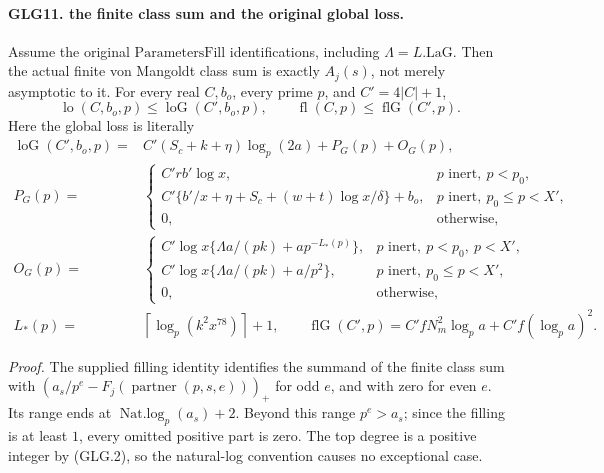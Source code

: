 \documentclass[11pt,a4paper]{article}
\numberwithin{equation}{section}
\theoremstyle{remark}\newtheorem{remark}[theorem]{Remark}
\begin{document}
\paragraph{GLG11. the finite class sum and the original global loss.}
\label{claim:GLG11}
Assume the original \(\mathrm{ParametersFill}\) identifications,
including \(\Lambda=L.\mathrm{LaG}\). Then the actual finite
von Mangoldt class sum is exactly \(A_j(s)\), not merely
asymptotic to it. For every real \(C,b_o\), every prime \(p\),
and \(C'=4|C|+1\),
\[
 \operatorname{lo}(C,b_o,p)\le\operatorname{loG}(C',b_o,p),
 \qquad
 \operatorname{fl}(C,p)\le\operatorname{flG}(C',p).                \tag{GLG.36}
\]
Here the global loss is literally
\[
 \begin{split}
 \operatorname{loG}(C',b_o,p)
 ={}&C'(S_c+k+\eta)\log_p(2a)+P_G(p)+O_G(p),\\
 P_G(p)={}&
 \begin{cases}
 C'rb'\log x,&p\text{ inert},\ p<p_0,\\
 C'\{b'/x+\eta+S_c+(w+t)\log x/\delta\}+b_o,
                          &p\text{ inert},\ p_0\le p<X',\\
 0,&\text{otherwise},
 \end{cases}\\
 O_G(p)={}&
 \begin{cases}
 C'\log x\{\Lambda a/(pk)+ap^{-L_*(p)}\},
                          &p\text{ inert},\ p<p_0,\ p<X',\\
 C'\log x\{\Lambda a/(pk)+a/p^2\},
                          &p\text{ inert},\ p_0\le p<X',\\
 0,&\text{otherwise},
 \end{cases}\\
 L_*(p)={}&\left\lceil\log_p(k^2x^{78})\right\rceil+1,\qquad
 \operatorname{flG}(C',p)=C'fN_m^2\log_pa+C'f(\log_pa)^2 .
 \end{split}                                                       \tag{GLG.37}
\]

\emph{Proof.}
The supplied filling identity identifies the summand of
the finite class sum with
\((a_s/p^e-F_j(\operatorname{partner}(p,s,e)))_+\) for
odd \(e\), and with zero for even \(e\). Its range ends
at \(\operatorname{Nat.log}_p(a_s)+2\). Beyond this range
\(p^e>a_s\); since the filling is at least \(1\), every
omitted positive part is zero. The top degree is a positive
integer by (GLG.2), so the natural-log convention causes
no exceptional case.
\end{document}
